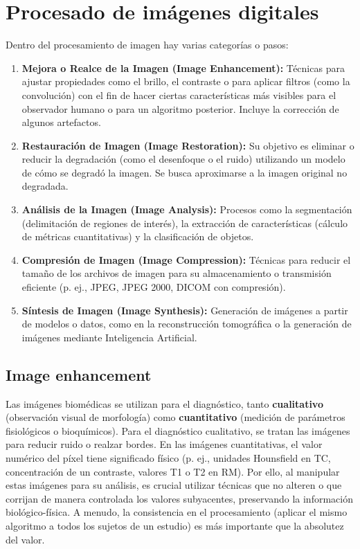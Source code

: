 \section{Procesado de imágenes digitales}
Dentro del procesamiento de imagen hay varias categorías o pasos:
\begin{enumerate}
\item \textbf{Mejora o Realce de la Imagen (Image Enhancement):} Técnicas para ajustar propiedades como el brillo, el contraste o para aplicar filtros (como la convolución) con el fin de hacer ciertas características más visibles para el observador humano o para un algoritmo posterior. Incluye la corrección de algunos artefactos.
\item \textbf{Restauración de Imagen (Image Restoration):} Su objetivo es eliminar o reducir la degradación (como el desenfoque o el ruido) utilizando un modelo de cómo se degradó la imagen. Se busca aproximarse a la imagen original no degradada.
\item \textbf{Análisis de la Imagen (Image Analysis):} Procesos como la segmentación (delimitación de regiones de interés), la extracción de características (cálculo de métricas cuantitativas) y la clasificación de objetos.
\item \textbf{Compresión de Imagen (Image Compression):} Técnicas para reducir el tamaño de los archivos de imagen para su almacenamiento o transmisión eficiente (p. ej., JPEG, JPEG 2000, DICOM con compresión).
\item \textbf{Síntesis de Imagen (Image Synthesis):} Generación de imágenes a partir de modelos o datos, como en la reconstrucción tomográfica o la generación de imágenes mediante Inteligencia Artificial.
\end{enumerate}

\subsection{Image enhancement}
Las imágenes biomédicas se utilizan para el diagnóstico, tanto \textbf{cualitativo} (observación visual de morfología) como \textbf{cuantitativo} (medición de parámetros fisiológicos o bioquímicos). Para el diagnóstico cualitativo, se tratan las imágenes para reducir ruido o realzar bordes. En las imágenes cuantitativas, el valor numérico del píxel tiene significado físico (p. ej., unidades Hounsfield en TC, concentración de un contraste, valores T1 o T2 en RM). Por ello, al manipular estas imágenes para su análisis, es crucial utilizar técnicas que no alteren o que corrijan de manera controlada los valores subyacentes, preservando la información biológico-física. A menudo, la consistencia en el procesamiento (aplicar el mismo algoritmo a todos los sujetos de un estudio) es más importante que la absolutez del valor.

